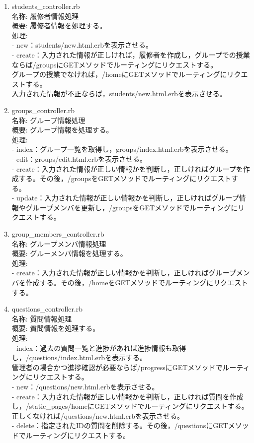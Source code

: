 \begin{enumerate}
\item students\_controller.rb\\
名称:
履修者情報処理\\
概要:
履修者情報を処理する。\\
処理:\\
- new：students/new.html.erbを表示させる。\\
- create：入力された情報が正しければ，履修者を作成し，グループでの授業ならば/groupsにGETメソッドでルーティングにリクエストする。\\
        グループの授業でなければ，/homeにGETメソッドでルーティングにリクエストする。\\
        入力された情報が不正ならば，students/new.html.erbを表示させる。

\item groups\_controller.rb\\
名称:
グループ情報処理\\
概要:
グループ情報を処理する。\\
処理:\\
- index：グループ一覧を取得し，groups/index.html.erbを表示させる。\\
- edit：groups/edit.html.erbを表示させる。\\
- create：入力された情報が正しい情報かを判断し，正しければグループを作成する。その後，/groupsをGETメソッドでルーティングにリクエストする。\\
- update：入力された情報が正しい情報かを判断し，正しければグループ情報やグループメンバを更新し，/groupsをGETメソッドでルーティングにリクエストする。

\item group\_members\_controller.rb\\
名称:
グループメンバ情報処理\\
概要:
グルーメンバ情報を処理する。\\
処理:\\
- create：入力された情報が正しい情報かを判断し，正しければグループメンバを作成する。その後，/homeをGETメソッドでルーティングにリクエストする。

\item questions\_controller.rb\\
名称:
質問情報処理\\
概要:
質問情報を処理する。\\
処理:\\
- index：過去の質問一覧と進捗があれば進捗情報も取得し，/questions/index.html.erbを表示する。\\
        管理者の場合かつ進捗確認が必要ならば/progressにGETメソッドでルーティングにリクエストする。\\
- new：/questions/new.html.erbを表示させる。\\
- create：入力された情報が正しい情報かを判断し，正しければ質問を作成し，/static\_pages/homeにGETメソッドでルーティングにリクエストする。\\
        正しくなければ/questions/new.html.erbを表示させる。\\
- delete：指定されたIDの質問を削除する。その後，/questionsにGETメソッドでルーティングにリクエストする。


\end{enumerate}
